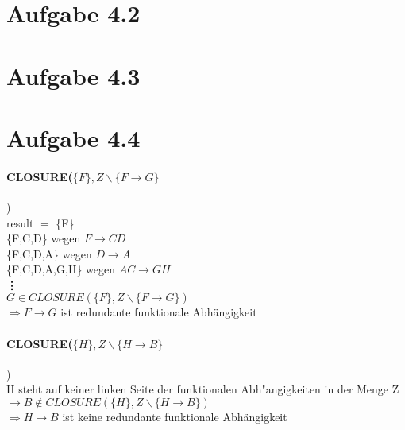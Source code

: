 \documentclass{article}
\begin{document}
		\pagebreak
	
	\section*{Aufgabe 4.2}
		
		
		
	\section*{Aufgabe 4.3}
		
		
	\section*{Aufgabe 4.4}
		\paragraph*{CLOSURE($\{ F \}, Z\backslash\{F \longrightarrow G\}$})\\
		result $=$ \{F\}\\
		
			\{F,C,D\} \hspace*{42mm} wegen $F \rightarrow CD$\\
			
			\{F,C,D,A\} \hspace*{39mm} wegen $D \rightarrow A$\\
			
			\{F,C,D,A,G,H\} \hspace*{32mm} wegen $AC \rightarrow GH$\\
			
			\hspace*{11mm}\textbf{\vdots}\\[1.2em]
			$G \in CLOSURE(\{F\}, Z \backslash \{F \longrightarrow G\})$\\
			$\Rightarrow F \rightarrow G$ ist redundante funktionale Abhängigkeit
	
		\paragraph*{CLOSURE($\{H\}, Z \backslash \{H \rightarrow B\}$})\\
		H steht auf keiner linken Seite der funktionalen Abh"angigkeiten in der Menge Z\\
		$\rightarrow B \notin CLOSURE(\{H\}, Z \backslash \{H \rightarrow B\})$\\ $\Rightarrow H \rightarrow B$ ist keine redundante funktionale Abhängigkeit
		
	
	
\end{document}
